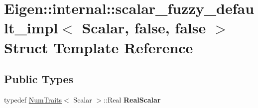 \hypertarget{struct_eigen_1_1internal_1_1scalar__fuzzy__default__impl_3_01_scalar_00_01false_00_01false_01_4}{}\section{Eigen\+::internal\+::scalar\+\_\+fuzzy\+\_\+default\+\_\+impl$<$ Scalar, false, false $>$ Struct Template Reference}
\label{struct_eigen_1_1internal_1_1scalar__fuzzy__default__impl_3_01_scalar_00_01false_00_01false_01_4}
\subsection*{Public Types}
\begin{DoxyCompactItemize}
\item 
\mbox{\label{struct_eigen_1_1internal_1_1scalar__fuzzy__default__impl_3_01_scalar_00_01false_00_01false_01_4_ac7a6fe76e747630758fe3c88904f1836}} 
typedef \mbox{\hyperlink{struct_eigen_1_1_num_traits}{Num\+Traits}}$<$ Scalar $>$\+::Real {\bfseries Real\+Scalar}
\end{DoxyCompactItemize}

